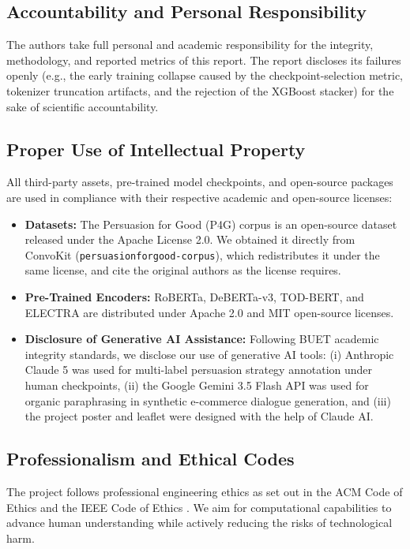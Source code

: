 \subsection{Accountability and Personal Responsibility}
\label{sec:accountability}
The authors take full personal and academic responsibility for the integrity, methodology, and reported metrics of this report. The report discloses its failures openly (e.g., the early training collapse caused by the checkpoint-selection metric, tokenizer truncation artifacts, and the rejection of the XGBoost stacker) for the sake of scientific accountability.

\subsection{Proper Use of Intellectual Property}
\label{sec:ip}
All third-party assets, pre-trained model checkpoints, and open-source packages are used in compliance with their respective academic and open-source licenses:
\begin{itemize}
  \item \textbf{Datasets:} The Persuasion for Good (P4G) corpus \cite{wang2019persuasion} is an open-source dataset released under the Apache License 2.0. We obtained it directly from ConvoKit \cite{chang2020convokit} (\texttt{persuasionforgood-corpus}), which redistributes it under the same license, and cite the original authors as the license requires.
  \item \textbf{Pre-Trained Encoders:} RoBERTa, DeBERTa-v3, TOD-BERT, and ELECTRA are distributed under Apache 2.0 and MIT open-source licenses.
  \item \textbf{Disclosure of Generative AI Assistance:} Following BUET academic integrity standards, we disclose our use of generative AI tools: (i) Anthropic Claude 5 was used for multi-label persuasion strategy annotation under human checkpoints, (ii) the Google Gemini 3.5 Flash API was used for organic paraphrasing in synthetic e-commerce dialogue generation, and (iii) the project poster and leaflet were designed with the help of Claude AI.
\end{itemize}

\subsection{Professionalism and Ethical Codes}
\label{sec:codes}
The project follows professional engineering ethics as set out in the ACM Code of Ethics \cite{acmcode} and the IEEE Code of Ethics \cite{ieeecode}. We aim for computational capabilities to advance human understanding while actively reducing the risks of technological harm.
